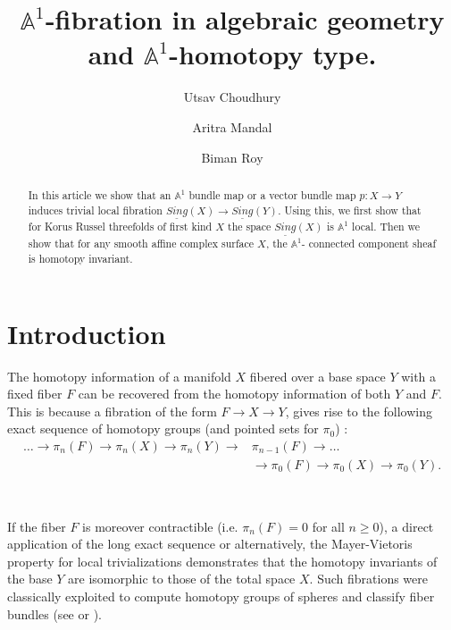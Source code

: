 \documentclass[11pt, reqno]{amsart}
\title{$\mathbb{A}^1$-fibration in algebraic geometry and $\mathbb{A}^1$-homotopy type.
}
\theoremstyle{plain}
\theoremstyle{definition}
\begin{document}


\author{Utsav Choudhury}



\author{Aritra Mandal}
	
\author{Biman Roy}
\begin{abstract}
	In this article we show that an $\mathbb{A}^1$ bundle map or a vector bundle map $p: X \to Y$ induces trivial local fibration $\underline{Sing}(X) \to \underline{Sing}(Y)$. Using this, we first show that for Korus Russel threefolds of first kind $X$ the space  $\underline{Sing}(X)$ is $\mathbb{A}^1$  local. Then we show that for any smooth affine complex surface $X$, the $\mathbb{A}^1$- connected component sheaf is homotopy invariant. 
\end{abstract}

\maketitle

\section{Introduction}	
The homotopy information of a manifold $X$ fibered over a base space $Y$ with a fixed fiber $F$ can be recovered from the homotopy information of both $Y$ and $F$. This is because a 
fibration of the form $F \to X \to Y$, gives rise to the following exact sequence of homotopy groups (and pointed sets for $\pi_0$) : 
\begin{align*}
	\dots \to \pi_n(F) \to \pi_n(X) \to \pi_n(Y) \to & \pi_{n-1}(F) \to \dots  \\
	&\to \pi_0(F) \to \pi_0(X) \to \pi_0(Y).
\end{align*}

\ 

If the fiber $F$ is moreover contractible (i.e. $\pi_n(F) = 0$ for all $n \geq 0$), a direct application of the long exact sequence or alternatively, the Mayer-Vietoris property for local trivializations demonstrates that the homotopy invariants of the base $Y$ are isomorphic to those of the total space $X$. Such fibrations were classically exploited to compute homotopy groups of spheres and classify fiber bundles (see \cite{steenrod} or \cite{serre thesis}).

\
\end{document}
